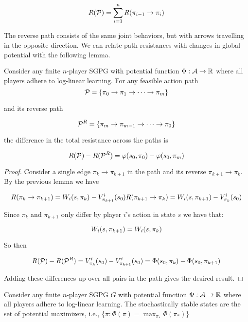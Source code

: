 $$
R(\mathcal{P}) = \sum_{i=1}^n R(\pi_{i-1} \rightarrow \pi_i)
$$

The reverse path consists of the same joint behaviors, but with arrows travelling in the opposite direction. We can relate path resistances with changes in global potential with the following lemma.


\begin{lem}
Consider any finite $n$-player SGPG with potential function $\Phi: \mathcal{A} \rightarrow \mathbb{R}$ where all players adhere to log-linear learning. For any feasible action path
$$
\mathcal{P} = \{\pi_0 \rightarrow \pi_1 \rightarrow \cdots \rightarrow \pi_m\}
$$

and its reverse path

$$
\mathcal{P}^R = \{\pi_m \rightarrow \pi_{m-1} \rightarrow \cdots \rightarrow \pi_0\}
$$

the difference in the total resistance across the paths is

$$
R(\mathcal{P}) - R(\mathcal{P}^R) = \varphi(s_0, \pi_0) - \varphi(s_0, \pi_m)
$$
\end{lem}

\begin{proof}
Consider a single edge $\pi_k \rightarrow \pi_{k+1}$ in the path and its reverse $\pi_{k+1} \rightarrow \pi_k$. By the previous lemma we have

$$
R(\pi_k \rightarrow \pi_{k+1}) = W_i(s, \pi_k) - V^i_{\pi_{k+1}}(s_0) \\
R(\pi_{k+1} \rightarrow \pi_{k}) = W_i(s, \pi_{k+1}) - V^i_{\pi_k}(s_0)
$$

Since $\pi_k$ and $\pi_{k+1}$ only differ by player $i$'s action in state $s$ we have that:

$$
W_i(s, \pi_{k+1}) = W_i(s, \pi_{k}) \\
$$

So then

$$
R(\mathcal{P}) - R(\mathcal{P}^R) = V^i_{\pi_k}(s_0) - V^i_{\pi_{k+1}}(s_0) = \Phi(s_0, \pi_k) - \Phi(s_0, \pi_{k+1})
$$

Adding these differences up over all pairs in the path gives the desired result.
\end{proof}



\begin{prop}
Consider any finite $n$-player SGPG $G$ with potential function $\Phi: \mathcal{A} \rightarrow \mathbb{R}$ where all players adhere to log-linear learning. The stochastically stable states are the set of potential maximizers, i.e., $\{ \pi : \Phi(\pi) = \max_{\pi_*} \Phi(\pi_*)  \}$
\end{prop}

